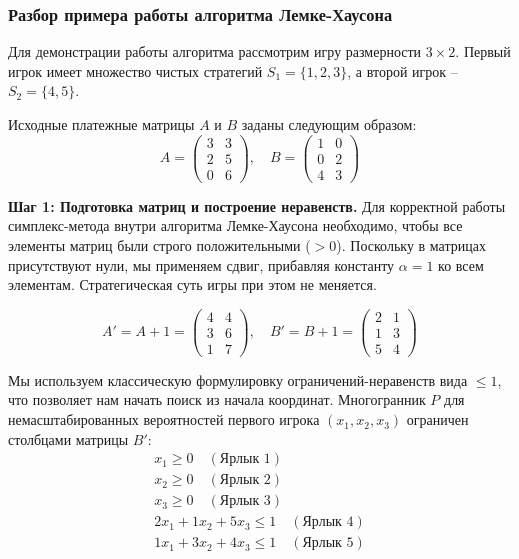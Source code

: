 \subsubsection{Разбор примера работы алгоритма Лемке-Хаусона}

Для демонстрации работы алгоритма рассмотрим игру размерности $3 \times 2$.
Первый игрок имеет множество чистых стратегий $S_1 = \{1, 2, 3\}$, а второй игрок – $S_2 = \{4, 5\}$. 

Исходные платежные матрицы $A$ и $B$ заданы следующим образом:
\begin{equation}
A = \begin{pmatrix}
    3 & 3 \\ 
    2 & 5 \\
    0 & 6 
    \end{pmatrix}, 
\quad 
B = \begin{pmatrix} 
    1 & 0 \\ 
    0 & 2 \\ 
    4 & 3 
    \end{pmatrix}
\end{equation}

\textbf{Шаг 1: Подготовка матриц и построение неравенств.}
Для корректной работы симплекс-метода внутри алгоритма Лемке-Хаусона необходимо, чтобы все элементы матриц были строго положительными ($> 0$). Поскольку в матрицах присутствуют нули, мы применяем сдвиг, прибавляя константу $\alpha = 1$ ко всем элементам. Стратегическая суть игры при этом не меняется.

\begin{equation}
A' = A + 1 = \begin{pmatrix} 
    4 & 4 \\ 
    3 & 6 \\ 
    1 & 7 \end{pmatrix}, 
    \quad 
B' = B + 1 = \begin{pmatrix} 
    2 & 1 \\ 
    1 & 3 \\ 
    5 & 4 \end{pmatrix}
\end{equation}

Мы используем классическую формулировку ограничений-неравенств вида $\le 1$, что позволяет нам начать поиск из начала координат. Многогранник $P$ для немасштабированных вероятностей первого игрока $(x_1, x_2, x_3)$ ограничен столбцами матрицы $B'$:
\begin{align}
    x_1 \ge 0 \quad (\text{Ярлык } 1) \\
    x_2 \ge 0 \quad (\text{Ярлык } 2) \\
    x_3 \ge 0 \quad (\text{Ярлык } 3) \\
    2x_1 + 1x_2 + 5x_3 \le 1 \quad (\text{Ярлык } 4) \\
    1x_1 + 3x_2 + 4x_3 \le 1 \quad (\text{Ярлык } 5)
\end{align}


